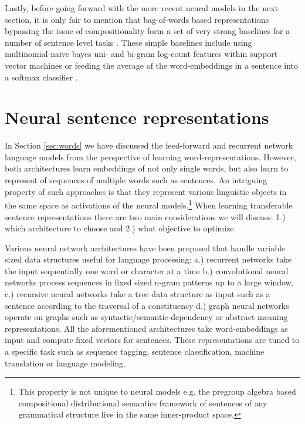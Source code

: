 Lastly, before going forward with the more recent neural models in the next section,
it is only fair to mention that bag-of-words
based representations bypassing the issue of compositionality form a set of very strong baselines
for a number of sentence level tasks \citep{hill2016learning}.
These simple baselines include using multinomial-naive bayes uni- and bi-gram
log-count features within support vector machines \citep{wang2012baselines} or
feeding the average of the word-embeddings in a sentence into a softmax classifier \citep{joulin2016bag}.


\section{Neural sentence representations}
\label{sec:trans-sentence}

In Section \ref{sec:words} we have discussed the feed-forward \citep{bengio2003neural}
and recurrent network \citep{mikolov2010recurrent} language models from the perspective
of learning word-representations. However, both architectures learn embeddings of not only single words,
but also learn to represent of sequences of multiple words such as sentences.
An intriguing property of such approaches is that
they represent various linguistic objects in the same space as activations of the neural models.\footnote{This property is not unique to neural models e.g. the pregroup algebra based compositional distributional
semantics framework of \cite{coecke2010mathematical}
sentences of any grammatical structure live in the same inner-product space.}
When learning transferable
sentence representations there are two main considerations we will discuss:
1.) which architecture to choose and 2.) what objective to optimize.

Various neural network architectures have been proposed that
handle variable sized data structures useful for language processing: a.) recurrent networks
take the input sequentially one word or character at a time
b.) convolutional neural networks
\citep{kalchbrenner2014convolutional,zhang2015character,conneau2016very,chen2013learning}
process sequences in fixed sized n-gram patterns up to a large window,
c.) recursive neural networks \citep{goller1996learning,socher2011parsing,tai2015improved}
take a tree data structure as input such as a sentence according to the traversal of a
constituency
d.) graph neural networks operate on graphs \citep{marcheggiani2017encoding} such as
syntactic/semantic-dependency or abstract meaning representations.
All the aforementioned architectures take word-embeddings as input
and compute fixed vectors for sentences.
These representations are tuned to a specific task such as sequence tagging,
sentence classification, machine translation or language modeling.


